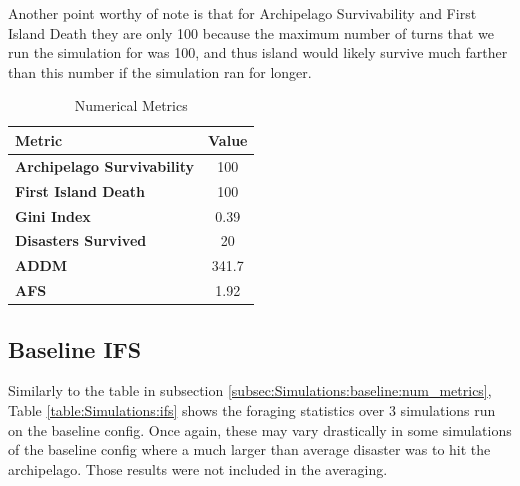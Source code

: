 Another point worthy of note is that for Archipelago Survivability and First Island Death they are only 100 because the maximum number of turns that we run the simulation for was 100, and thus island would likely survive much farther than this number if the simulation ran for longer.
\begin{table}[htb]
    \centering
    \begin{tabular}{|l|c|}
    \hline
    \textbf{Metric}                     & \textbf{Value} \\ \hline
    \textbf{Archipelago Survivability}  & 100     \\
    \textbf{First Island Death}         & 100     \\
    \textbf{Gini Index}                 & 0.39    \\
    \textbf{Disasters Survived}         & 20     \\
    \textbf{ADDM}                       & 341.7     \\
    \textbf{AFS}                        & 1.92     \\ \hline
\end{tabular}
\caption{Numerical Metrics}
\label{table:Simulations:num_metric}
\end{table}

\subsection{Baseline IFS}
\label{subsec:Simulations:baseline:ifs}

Similarly to the table in subsection \ref{subsec:Simulations:baseline:num_metrics}, Table \ref{table:Simulations:ifs} shows the foraging statistics over 3 simulations run on the baseline config. Once again, these may vary drastically in some simulations of the baseline config where a much larger than average disaster was to hit the archipelago. Those results were not included in the averaging.

